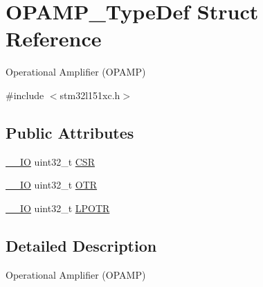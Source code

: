 \hypertarget{struct_o_p_a_m_p___type_def}{\section{O\-P\-A\-M\-P\-\_\-\-Type\-Def Struct Reference}
\label{struct_o_p_a_m_p___type_def}
}


Operational Amplifier (O\-P\-A\-M\-P)  




{\ttfamily \#include $<$stm32l151xc.\-h$>$}

\subsection*{Public Attributes}
\begin{DoxyCompactItemize}
\item 
\hyperlink{core__sc300_8h_aec43007d9998a0a0e01faede4133d6be}{\-\_\-\-\_\-\-I\-O} uint32\-\_\-t \hyperlink{struct_o_p_a_m_p___type_def_aa3123f8a6ca8605b6687b9ee3f11e8ef}{C\-S\-R}
\item 
\hyperlink{core__sc300_8h_aec43007d9998a0a0e01faede4133d6be}{\-\_\-\-\_\-\-I\-O} uint32\-\_\-t \hyperlink{struct_o_p_a_m_p___type_def_a6a80544bc693d9c51045b3652c43fd22}{O\-T\-R}
\item 
\hyperlink{core__sc300_8h_aec43007d9998a0a0e01faede4133d6be}{\-\_\-\-\_\-\-I\-O} uint32\-\_\-t \hyperlink{struct_o_p_a_m_p___type_def_a285131c897741d5290937f8f4f297e08}{L\-P\-O\-T\-R}
\end{DoxyCompactItemize}


\subsection{Detailed Description}
Operational Amplifier (O\-P\-A\-M\-P) 

